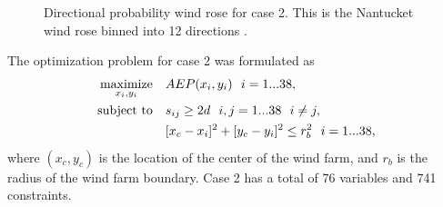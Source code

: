 \documentclass[journal abbreviation, manuscript]{copernicus}
\begin{document}
\begin{figure}[h!]
\begin{minipage}[t]{18pc}
			\caption{Directional probability wind rose for case 2. This is the Nantucket wind rose binned into 12 directions \cite{wrcc2017}.}
			\label{fig:freqwindrose_12dir}
		\end{minipage}
	\end{figure}
	
	The optimization problem for case 2 was formulated as
	\begin{equation}\label{eq:case2}
		\begin{aligned} [b]
			\underset{x_i,y_i}{\textrm{maximize}} \quad & AEP(x_i,y_i)~~i=1...38,\\
			\textrm{subject to} \quad & s_{ij} \geq 2\*d~~i,j=1...38~~i \neq j,\\
			& [x_c-x_i]^2+[y_c-y_i]^2 \leq r_{b}^2~~i=1...38,
		\end{aligned}
	\end{equation}
	where $(x_c,y_c)$ is the location of the center of the wind farm, and $r_b$ is the radius of the wind farm boundary. Case 2 has a total of 76 variables and 741 constraints.
	
\end{document}
